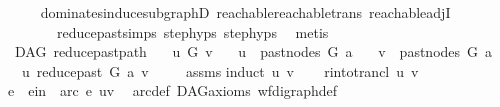 \begin{isabellebody}
\ \ \ \ \isamarkupfalse%
\ dominates{\isacharunderscore}{\kern0pt}induce{\isacharunderscore}{\kern0pt}subgraphD\ reachable{}{\isacharunderscore}{\kern0pt}reachable{\isacharunderscore}{\kern0pt}trans\ reachable{\isacharunderscore}{\kern0pt}adjI\ \isanewline
\ \ \ \ \ \ \ \ reduce{\isacharunderscore}{\kern0pt}past{\isachardot}{\kern0pt}simps\ step{\isachardot}{\kern0pt}hyps{\isacharparenleft}{\kern0pt}{}{\isacharparenright}{\kern0pt}\ step{\isachardot}{\kern0pt}hyps{\isacharparenleft}{\kern0pt}{}{\isacharparenright}{\kern0pt}\ \isamarkupfalse%
\ metis\isanewline
\ \ \ \ \ \isanewline
{}\isamarkupfalse%
%
\endisatagproof
{\isafoldproof}%
%
\isadelimproof
\isanewline
%
\endisadelimproof
\isanewline
{}\isamarkupfalse%
\ {\isacharparenleft}{\kern0pt}\ DAG{\isacharparenright}{\kern0pt}\ reduce{\isacharunderscore}{\kern0pt}past{\isacharunderscore}{\kern0pt}path{}{\isacharcolon}{\kern0pt}\isanewline
\ \ \ {\isachardoublequoteopen}u\ {\isasymrightarrow}\isactrlsup {\isacharplus}{\kern0pt}\isactrlbsub G\isactrlesub \ v{\isachardoublequoteclose}\isanewline
\ \ \ {\isachardoublequoteopen}u\ {\isasymin}\ past{\isacharunderscore}{\kern0pt}nodes\ G\ a{\isachardoublequoteclose}\isanewline
\ \ \ {\isachardoublequoteopen}v\ {\isasymin}\ past{\isacharunderscore}{\kern0pt}nodes\ G\ a{\isachardoublequoteclose}\isanewline
\ \ \ {\isachardoublequoteopen}u\ {\isasymrightarrow}\isactrlsup {\isacharplus}{\kern0pt}\isactrlbsub reduce{\isacharunderscore}{\kern0pt}past\ G\ a\isactrlesub \ v{\isachardoublequoteclose}\ \isanewline
%
\isadelimproof
\ \ %
\endisadelimproof
%
\isatagproof
{}\isamarkupfalse%
\ assms\isanewline
{}\isamarkupfalse%
{\isacharparenleft}{\kern0pt}induct\ u\ v{\isacharparenright}{\kern0pt}\isanewline
\ \ \isamarkupfalse%
\ {\isacharparenleft}{\kern0pt}r{\isacharunderscore}{\kern0pt}into{\isacharunderscore}{\kern0pt}trancl\ u\ v\ {\isacharparenright}{\kern0pt}\isanewline
\ \ \isamarkupfalse%
\ \isamarkupfalse%
\ e\ \ e{\isacharunderscore}{\kern0pt}in{\isacharcolon}{\kern0pt}\ {\isachardoublequoteopen}\ arc\ e\ {\isacharparenleft}{\kern0pt}u{\isacharcomma}{\kern0pt}v{\isacharparenright}{\kern0pt}{\isachardoublequoteclose}\ \isamarkupfalse%
\ arc{\isacharunderscore}{\kern0pt}def\ DAG{\isacharunderscore}{\kern0pt}axioms\ wf{\isacharunderscore}{\kern0pt}digraph{\isacharunderscore}{\kern0pt}def\isanewline

\end{isabellebody}
